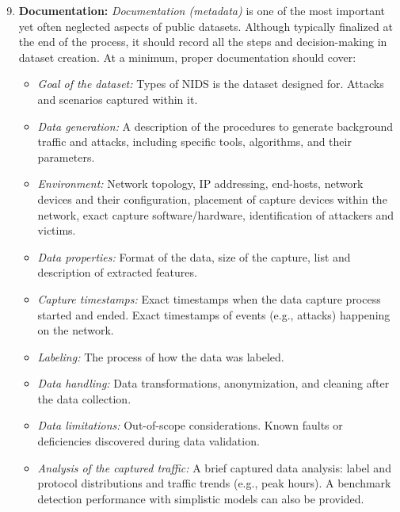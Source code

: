 \begin{enumerate}[nosep, label=\textbf{\arabic*}., topsep=0pt, wide, labelindent=\parindent, itemsep=0pt, parsep=0pt]
\setcounter{enumi}{8}
\item \textbf{Documentation:} \emph{Documentation (metadata)} is one of the most important yet often neglected aspects of public datasets. Although typically finalized at the end of the process, it should record all the steps and decision-making in dataset creation. At a minimum, proper documentation should cover:

\begin{itemize}[topsep=0.1em,itemsep=0.4em,parsep=0cm]
    \item \emph{Goal of the dataset:} Types of NIDS is the dataset designed for. Attacks and scenarios captured within it.
    
    \item \emph{Data generation:} A description of the procedures to generate background traffic and attacks, including specific tools, algorithms, and their parameters.

    \item \emph{Environment:} Network topology, IP addressing, end-hosts, network devices and their configuration, placement of capture devices within the network, exact capture software/hardware, identification of attackers and victims.

    \item \emph{Data properties:} Format of the data, size of the capture, list and description of extracted features.
    
    \item \emph{Capture timestamps:} Exact timestamps when the data capture process started and ended. Exact timestamps of events (e.g., attacks) happening on the network.

    \item \emph{Labeling:} The process of how the data was labeled.

    \item \emph{Data handling:} Data transformations, anonymization, and cleaning after the data collection.

    \item \emph{Data limitations:} Out-of-scope considerations. Known faults or deficiencies discovered during data validation.

    \item \emph{Analysis of the captured traffic:} A brief captured data analysis: label and protocol distributions and traffic trends (e.g., peak hours). A benchmark detection performance with simplistic models can also be provided.
\end{itemize}


\end{enumerate}
